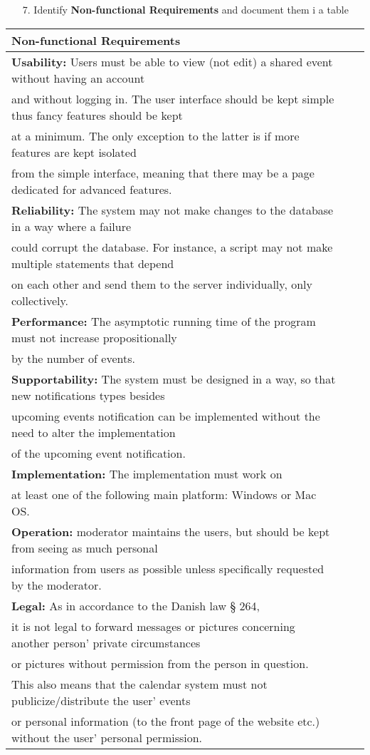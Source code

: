 \documentclass{article}
\begin{document}
\begin{enumerate}
		\item[7.] Identify \textbf{Non-functional Requirements} and document them i a table\\
\end{enumerate}

\begin{tabular}{l r @{} l}
	\textbf{Non-functional Requirements}\\
	\hline
	\textbf{Usability:} Users must be able to view (not edit) a shared event without having an account\\
	 and without logging in. The user interface should be kept simple thus fancy features should be kept\\
	 at a minimum. The only exception to the latter is if more features are kept isolated\\ 
	 from the simple interface, meaning that there may be a page dedicated for advanced features.\\
	\hline
	\textbf{Reliability:} The system may not make changes to the database in a way where a failure\\
	 could corrupt the database. For instance, a script may not make multiple statements that depend\\
	 on each other and send them to the server individually, only collectively.\\
	\hline
	\textbf{Performance:} The asymptotic running time of the program must not increase propositionally\\
	by the number of events.\\
	\hline
	\textbf{Supportability:} The system must be designed in a way, so that new notifications types besides\\
	upcoming events notification can be implemented without the need to alter the implementation\\
	of the upcoming event notification.\\
	\hline
	\textbf{Implementation:} The implementation must work on\\
	at least one of the following main platform: Windows or Mac OS.\\
	\hline
	\textbf{Operation:} moderator maintains the users, but should be kept from seeing as much personal\\
	 information from users as possible unless specifically requested by the moderator.\\
	\hline
	\textbf{Legal:}  As in accordance to the Danish law § 264,\\
	 it is not legal to forward messages or pictures concerning another person’ private circumstances\\
	 or pictures without permission from the person in question.\\ 
	This also means that the calendar system must not publicize/distribute the user’ events\\
	 or personal information (to the front page of the website etc.) without the user’ personal permission.\\
	\hline
\end{tabular}
\end{document}
